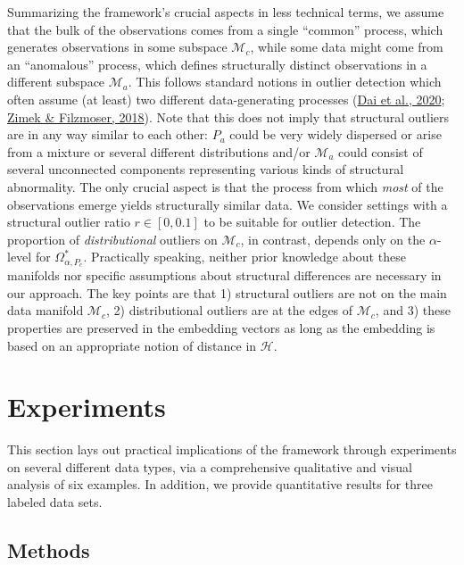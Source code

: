 \documentclass[
  10pt]{article}
\newcommand{\hdspace}{\mathcal{H}}
\newcommand{\co}{c}
\newcommand{\an}{a}
\newcommand{\Min}{\mathcal{M}_{\co}}
\newcommand{\Man}{\mathcal{M}_{\an}}
\newcommand{\Pin}{P_{\co}}
\newcommand{\Pan}{P_{\an}}
\begin{document}
Summarizing the framework's crucial aspects in less technical terms, we assume that the bulk of the observations comes from a single ``common'' process, which generates observations in some subspace \(\Min\), while some data might come from an ``anomalous'' process, which defines structurally distinct observations in a different subspace \(\Man\). This follows standard notions in outlier detection which often assume (at least) two different data-generating processes (\protect\hyperlink{ref-dai2020functional}{Dai et al., 2020}; \protect\hyperlink{ref-zimek2018there}{Zimek \& Filzmoser, 2018}). Note that this does not imply that structural outliers are in any way similar to each other: \(\Pan\) could be very widely dispersed or arise from a mixture or several different distributions and/or \(\Man\) could consist of several unconnected components representing various kinds of structural abnormality. The only crucial aspect is that the process from which \emph{most} of the observations emerge yields structurally similar data.
We consider settings with a structural outlier ratio \(r \in [0, 0.1]\) to be suitable for outlier detection. The proportion of \emph{distributional} outliers on \(\Min\), in contrast, depends only on the \(\alpha\)-level for \(\Omega^*_{\alpha, \Pin}\).
Practically speaking, neither prior knowledge about these manifolds nor specific assumptions about structural differences are necessary in our approach.
The key points are that 1) structural outliers are not on the main data manifold \(\Min\), 2) distributional outliers are at the edges of \(\Min\), and 3) these properties are preserved in the embedding vectors as long as the embedding is based on an appropriate notion of distance in \(\hdspace\).

\section{Experiments}\label{sec:exps}

This section lays out practical implications of the framework through experiments on several different data types, via a comprehensive qualitative and visual analysis of six examples. In addition, we provide quantitative results for three labeled data sets.

\subsection{Methods}\label{sec:exps:meths}
\end{document}
